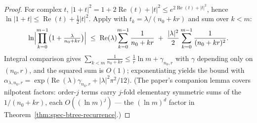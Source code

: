 \begin{proof}
For complex $t$, $|1+t|^2 = 1 + 2\operatorname{Re}(t) + |t|^2 \le
e^{2\operatorname{Re}(t) + |t|^2}$, hence $\ln|1+t| \le
\operatorname{Re}(t) + \frac{1}{2}|t|^2$. Apply with $t_k =
\lambda/(n_0+kr)$ and sum over $k < m$:
\[
\ln \Bigl|\prod_{k=0}^{m-1}\bigl(1 + \tfrac{\lambda}{n_0+kr}\bigr)\Bigr|
\;\le\; \operatorname{Re}(\lambda)\! \sum_{k=0}^{m-1} \frac{1}{n_0 + kr}
\;+\; \frac{|\lambda|^2}{2} \sum_{k=0}^{m-1} \frac{1}{(n_0 + kr)^2}.
\]
Integral comparison gives $\sum_{k<m} \frac{1}{n_0+kr} \le \frac{1}{r}\ln m
+ \gamma_{n_0,r}$ with $\gamma$ depending only on $(n_0, r)$, and the
squared sum is $O(1)$; exponentiating yields the bound with
$\alpha_{\lambda,n_0,r} = \exp\!\bigl(\operatorname{Re}(\lambda)\gamma_{n_0,
r} + |\lambda|^2\pi^2/12\bigr)$. (The paper's companion lemma covers
nilpotent factors: order-$j$ terms carry $j$-fold elementary symmetric sums
of the $1/(n_0+kr)$, each $O((\ln m)^j)$ --- the $(\ln m)^d$ factor in
Theorem~\ref{thm:spec-btree-recurrence}.)
\end{proof}



